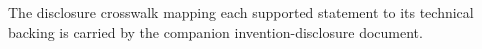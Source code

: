\documentclass[reprint,aps,prx,showpacs,bibfootnote,preprintnumbers,superscriptaddress,amsmath,amssymb]{revtex4-2}
\begin{document}
\appendix





\noindent The disclosure crosswalk mapping each supported statement to its technical backing is carried by the companion invention-disclosure document.


\end{document}
